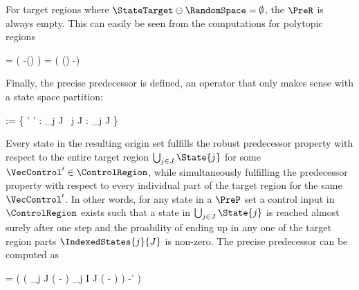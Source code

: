     For target regions where $\StateTarget \ominus \RandomSpace = \emptyset$, the $\PreR$ is always empty.
    This can easily be seen from the computations for polytopic regions

    \startformula
        \startalign[n=2,align={right,left}]
            \NC {} =
            \NC \StateRegion \cap \Big( \StateTarget \oplus -(\MatB \ControlRegion \oplus \RandomSpace) \Big) \MatA \EndAnd
            \NR
            \NC {} =
            \NC \StateRegion \cap \Big( (\StateTarget \ominus \RandomSpace) \oplus -\MatB \ControlRegion \Big) \MatA \EndPeriod
            \NR
        \stopalign
    \stopformula

    Finally, the precise predecessor is defined, an operator that only makes sense with a state space partition:

    \startformula
        \startalign[n=2,align={right,left}]
            \NC {} := \Big\{ \VecState \in \StateRegion \Bigmid \exists \VecControl' \in \ControlSpace' :
            \NC {} \subseteq \bigcup_{j \in J}  \;
            \NR
            \NC \empty
            \NC ~\forall j \in J :  \cap \bigcup_{j \in J}  \neq \emptyset \Big\} \EndPeriod
            \NR
        \stopalign
    \stopformula

    Every state in the resulting origin set fulfills the robust predecessor property with respect to the entire target region $\bigcup_{j \in J} \State{j}$ for some $\VecControl' \in \ControlRegion$, while simultaneously fulfilling the predecessor property with respect to every individual part of the target region for the same $\VecControl'$.
    In other words, for any state in a $\PreP$ set a control input in $\ControlRegion$ exists such that a state in $\bigcup_{j \in J} \State{j}$ is reached almost surely after one step and the proability of ending up in any one of the target region parts $\IndexedStates{j}{J}$ is non-zero.
    The precise predecessor can be computed as

    \startformula
         =
        \Big( \Big( \bigcap_{j \in J} ( \oplus - \RandomSpace) \setminus \bigcup_{j \in I \setminus J} (  \oplus - \RandomSpace ) \Big) \oplus -\MatB \ControlSpace' \Big) \MatA \EndPeriod
    \stopformula

